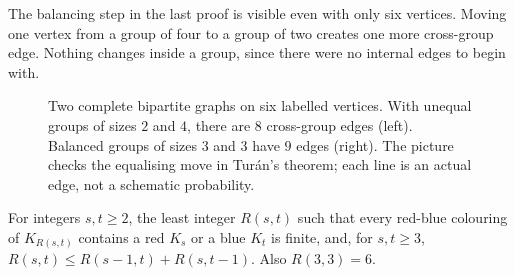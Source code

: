 The balancing step in the last proof is visible even with only six vertices. Moving one vertex from a group of four to a group of two creates one more cross-group edge. Nothing changes inside a group, since there were no internal edges to begin with.

\begin{figure}[ht]
\centering
{}
\caption{Two complete bipartite graphs on six labelled vertices. With unequal groups of sizes $2$ and $4$, there are $8$ cross-group edges (left). Balanced groups of sizes $3$ and $3$ have $9$ edges (right). The picture checks the equalising move in Tur\'an's theorem; each line is an actual edge, not a schematic probability.}
\label{fig:appbturan}
\end{figure}

\begin{theorem}[Ramsey]\label{thm:ramsey}
For integers $s,t\ge2$, the least integer $R(s,t)$ such that every red-blue colouring of $K_{R(s,t)}$ contains a red $K_s$ or a blue $K_t$ is finite, and, for $s,t\ge3$, $R(s,t)\le R(s-1,t)+R(s,t-1)$. Also $R(3,3)=6$.
\end{theorem}
